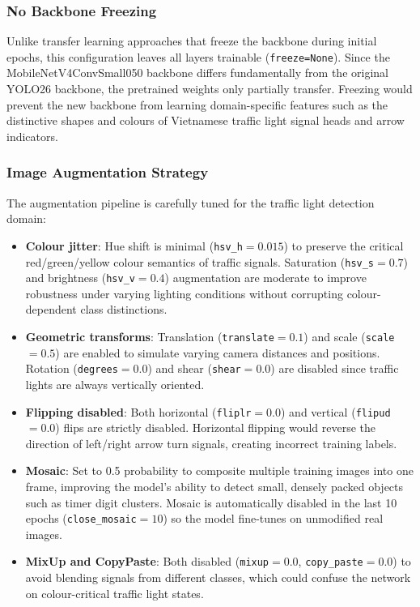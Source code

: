 \subsubsection{No Backbone Freezing}
Unlike transfer learning approaches that freeze the backbone during initial epochs, this configuration leaves all layers trainable (\texttt{freeze=None}). Since the MobileNetV4ConvSmall050 backbone differs fundamentally from the original YOLO26 backbone, the pretrained weights only partially transfer. Freezing would prevent the new backbone from learning domain-specific features such as the distinctive shapes and colours of Vietnamese traffic light signal heads and arrow indicators.

\subsubsection{Image Augmentation Strategy}
The augmentation pipeline is carefully tuned for the traffic light detection domain:

\begin{itemize}
    \item \textbf{Colour jitter}: Hue shift is minimal (\texttt{hsv\_h}$=0.015$) to preserve the critical red/green/yellow colour semantics of traffic signals. Saturation (\texttt{hsv\_s}$=0.7$) and brightness (\texttt{hsv\_v}$=0.4$) augmentation are moderate to improve robustness under varying lighting conditions without corrupting colour-dependent class distinctions.
    \item \textbf{Geometric transforms}: Translation (\texttt{translate}$=0.1$) and scale (\texttt{scale}$=0.5$) are enabled to simulate varying camera distances and positions. Rotation (\texttt{degrees}$=0.0$) and shear (\texttt{shear}$=0.0$) are disabled since traffic lights are always vertically oriented.
    \item \textbf{Flipping disabled}: Both horizontal (\texttt{fliplr}$=0.0$) and vertical (\texttt{flipud}$=0.0$) flips are strictly disabled. Horizontal flipping would reverse the direction of left/right arrow turn signals, creating incorrect training labels.
    \item \textbf{Mosaic}: Set to 0.5 probability to composite multiple training images into one frame, improving the model's ability to detect small, densely packed objects such as timer digit clusters. Mosaic is automatically disabled in the last 10 epochs (\texttt{close\_mosaic}$=10$) so the model fine-tunes on unmodified real images.
    \item \textbf{MixUp and CopyPaste}: Both disabled (\texttt{mixup}$=0.0$, \texttt{copy\_paste}$=0.0$) to avoid blending signals from different classes, which could confuse the network on colour-critical traffic light states.
\end{itemize}

